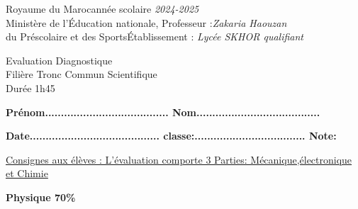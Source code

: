 \documentclass[12pt]{article}
\newcommand\headerMe[2]{\noindent{}#1\hfill#2}
\begin{document}
\headerMe{Royaume du Maroc}{année scolaire \emph{2024-2025}}\\
\headerMe{Ministère de l'Éducation nationale, }{  Professeur :\emph{Zakaria Haouzan}}\\
\headerMe{du Préscolaire et des Sports}{Établissement : \emph{Lycée SKHOR qualifiant}}\\
\begin{center}
	\vspace{-0.8cm}
Evaluation Diagnostique \\
Filière Tronc Commun Scientifique\\
Durée 1h45
\\
\end{center}
\begin{center}
	\vspace{-0.2cm}
	\textbf{ Prénom.......................................  Nom.......................................}
	
	\vspace{0.2cm}
	\textbf{ Date.........................................  classe:................................... Note: }
		
\end{center}
\begin{center}

	\vspace{-0.55cm}
\underline{Consignes aux élèves : L’évaluation comporte 3 Parties: Mécanique,électronique et Chimie}

	\hrulefill
\textbf{Physique 70\%}
\hrulefill
\end{center}
\end{document}
